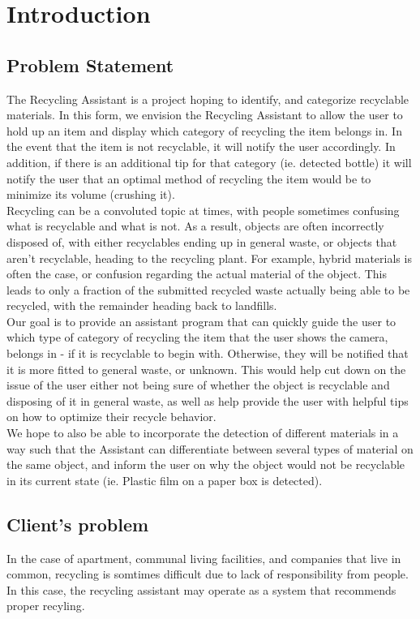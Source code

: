 \documentclass[conference]{IEEEtran}
\begin{document}
\newpage

\section{Introduction}
\subsection{Problem Statement}
The Recycling Assistant is a project hoping to identify, and categorize recyclable materials. In this form, we envision the Recycling Assistant to allow the user to hold up an item and display which category of recycling the item belongs in. In the event that the item is not recyclable, it will notify the user accordingly. In addition, if there is an additional tip for that category (ie. detected bottle) it will notify the user that an optimal method of recycling the item would be to minimize its volume (crushing it). \\
Recycling can be a convoluted topic at times, with people sometimes confusing what is recyclable and what is not. As a result, objects are often incorrectly disposed of, with either recyclables ending up in general waste, or objects that aren't recyclable, heading to the recycling plant. For example, hybrid materials is often the case, or confusion regarding the actual material of the object. This leads to only a fraction of the submitted recycled waste actually being able to be recycled, with the remainder heading back to landfills. \\

Our goal is to provide an assistant program that can quickly guide the user to which type of category of recycling the item that the user shows the camera, belongs in - if it is recyclable to begin with. Otherwise, they will be notified that it is more fitted to general waste, or unknown. This would help cut down on the issue of the user either not being sure of whether the object is recyclable and disposing of it in general waste, as well as help provide the user with helpful tips on how to optimize their recycle behavior.\\
We hope to also be able to incorporate the detection of different materials in a way such that the Assistant can differentiate between several types of material on the same object, and inform the user on why the object would not be recyclable in its current state (ie. Plastic film on a paper box is detected).\\

\subsection{Client's problem}
In the case of apartment, communal living facilities, and companies that live in common, recycling is somtimes difficult due to lack of responsibility from people. In this case, the recycling assistant may operate as a system that recommends proper recyling. \\
\end{document}
